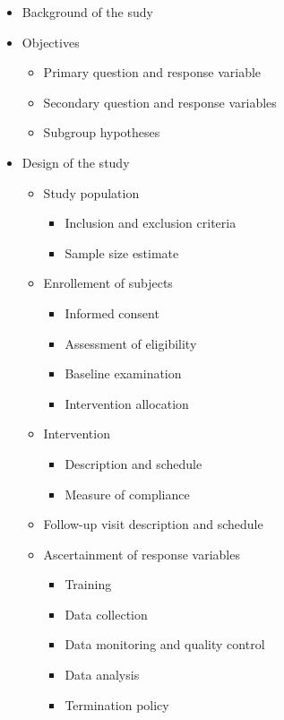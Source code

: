 \documentclass[final, paper=letter,5p,times,twocolumn]{elsarticle}
\theoremstyle{definition}
\begin{document}
\begin{itemize}

\item Background of the sudy

\item Objectives
  \begin{itemize}
  \item Primary question and response variable
  \item Secondary question and response variables
  \item Subgroup hypotheses
  \end{itemize}

\item Design of the study
  \begin{itemize}
  \item Study population
    \begin{itemize}
    \item Inclusion and exclusion criteria
    \item Sample size estimate
    \end{itemize}
  \item Enrollement of subjects
    \begin{itemize}
    \item Informed consent
    \item Assessment of eligibility
    \item Baseline examination
    \item Intervention allocation
    \end{itemize}
  \item Intervention
    \begin{itemize}
    \item Description and schedule
    \item Measure of compliance
    \end{itemize}
  \item Follow-up visit description and schedule
  \item Ascertainment of response variables
    \begin{itemize}
    \item Training
    \item Data collection
    \item Data monitoring and quality control
    \item Data analysis
    \item Termination policy
    \end{itemize}
  \end{itemize}
  

\end{itemize}
\end{document}
